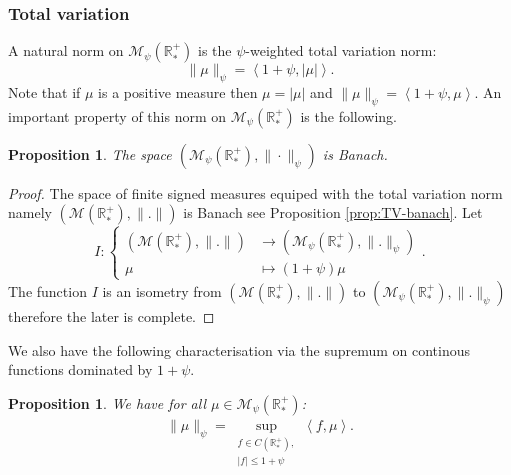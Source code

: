 \documentclass[11pt,a4paper]{article}
\newcommand{\RRP}{\mathbb{R}^+_*}
\newcommand{\MC}{\mathcal{M}}
\newcommand{\brac}[1]{\left\langle#1\right\rangle}
\newtheorem{proposition}[theorem]{Proposition}
\begin{document}
\subsubsection*{Total variation}
A natural norm on $\MC_{\psi}(\RRP)$ is the $\psi$-weighted total variation norm:
\[
\|\mu\|_{\psi} = \brac{1 + \psi, |\mu|}.
\]
Note that if $\mu$ is a positive measure then $\mu = |\mu|$ and $\|\mu\|_{\psi} = \brac{1 + \psi,\mu}$. An important property of this norm on $\MC_{\psi}(\RRP)$ is the following.
\begin{proposition}
    The space $\left(\MC_{\psi}(\RRP),\|\cdot\|_{\psi} \right)$ is Banach.
\end{proposition}
\begin{proof}
    The space of finite signed measures equiped with the total variation norm namely \(\left(\MC\left(\RRP\right),\| .\|\right) \) is Banach see Proposition \ref{prop:TV-banach}. Let 
    \begin{equation*}
        I :
        \left\lbrace
        \begin{aligned}
            \left(\MC\left(\RRP\right),\| .\|\right) &\to \left(\MC_{\psi}\left(\RRP\right),\| .\|_{\psi}\right) \\
            \mu &\mapsto (1 +\psi) \mu
        \end{aligned}
        \right. .
    \end{equation*}
    The function $I$ is an isometry from \(\left(\MC\left(\RRP\right),\| .\|\right) \) to \(\left(\MC_{\psi}\left(\RRP\right),\| .\|_{\psi}\right) \) therefore the later is complete.
\end{proof}
We also have the following characterisation via the supremum on continous functions dominated by $1 + \psi$.
\begin{proposition}
    We have for all $\mu \in \MC_{\psi}(\RRP)$:
    \begin{align*}
        \|\mu\|_{\psi} = \sup\limits_{\substack{f \in C(\RRP), \\ |f| \leq 1 + \psi}} \brac{f,\mu}.
    \end{align*}
\end{proposition}
\end{document}
